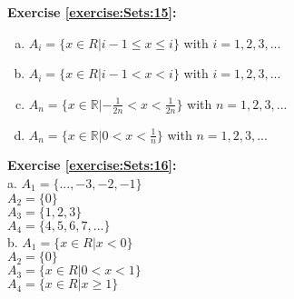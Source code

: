 \noindent\textbf{Exercise \ref{exercise:Sets:15}:} %
\begin{enumerate}[(a)]
\item
$A_i=\{x\in R|i-1 \le x\le i\}$ with $i=1,2,3,...$

\item
$A_i=\{x\in R|i-1 < x < i\}$ with $i=1,2,3,...$

\item
$A_{n}=\{x\in \mathbb {R}|-\frac{1}{2n}< x < \frac{1}{2n}\}$ with $n=1,2,3,...$

 \item
$A_{n}=\{x\in \mathbb {R}|0 < x < \frac{1}{n}\}$ with $n=1,2,3,...$
\end{enumerate}

\noindent\textbf{Exercise \ref{exercise:Sets:16}:}\\
a. $A_1=\{...,-3,-2,-1\} $\\
$A_2=\{0\}$\\
$A_3=\{1,2,3\}$\\
$A_4=\{4,5,6,7,...\}$\\
b. $A_1=\{x\in R|x<0\}$\\
$A_2=\{0\}$\\
$A_3=\{x\in R|0<x<1\}$\\
$A_4=\{x\in R|x\ge 1\}$\\

